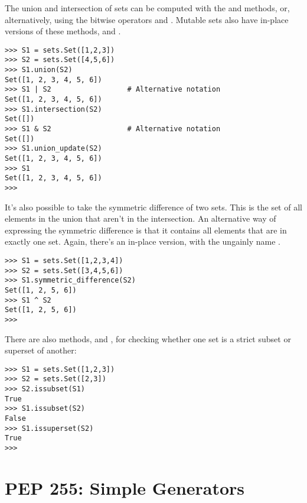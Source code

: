 \documentclass{howto}
\begin{document}
The union and intersection of sets can be computed with the
 and  methods, or,
alternatively, using the bitwise operators \samp{\&} and \samp{|}.
Mutable sets also have in-place versions of these methods,
 and .

\begin{verbatim}
>>> S1 = sets.Set([1,2,3])
>>> S2 = sets.Set([4,5,6])
>>> S1.union(S2)
Set([1, 2, 3, 4, 5, 6])
>>> S1 | S2                  # Alternative notation
Set([1, 2, 3, 4, 5, 6])
>>> S1.intersection(S2)  
Set([])
>>> S1 & S2                  # Alternative notation
Set([])
>>> S1.union_update(S2)
Set([1, 2, 3, 4, 5, 6])
>>> S1
Set([1, 2, 3, 4, 5, 6])
>>> 
\end{verbatim}

It's also possible to take the symmetric difference of two sets.  This
is the set of all elements in the union that aren't in the
intersection.  An alternative way of expressing the symmetric
difference is that it contains all elements that are in exactly one
set.  Again, there's an in-place version, with the ungainly name
.

\begin{verbatim}
>>> S1 = sets.Set([1,2,3,4])
>>> S2 = sets.Set([3,4,5,6])
>>> S1.symmetric_difference(S2)
Set([1, 2, 5, 6])
>>> S1 ^ S2
Set([1, 2, 5, 6])
>>>
\end{verbatim}

There are also methods,  and ,
for checking whether one set is a strict subset or superset of
another:

\begin{verbatim}
>>> S1 = sets.Set([1,2,3])
>>> S2 = sets.Set([2,3])
>>> S2.issubset(S1)
True
>>> S1.issubset(S2)
False
>>> S1.issuperset(S2)
True
>>>
\end{verbatim}


\begin{seealso}


\end{seealso}



\section{PEP 255: Simple Generators\label{section-generators}}
\end{document}
